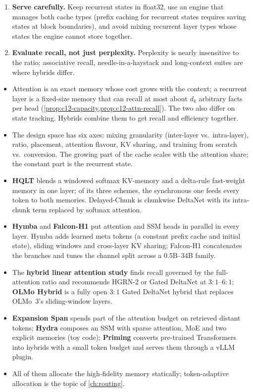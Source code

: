 \begin{enumerate}
  Otherwise prime a pre-trained Transformer: seed the recurrent layers from the attention weights,
  distill on final hidden states, then post-train with long-context data.
  \item \textbf{Serve carefully.} Keep recurrent states in float32, use an engine that manages
  both cache types (prefix caching for recurrent states requires saving states at block
  boundaries), and avoid mixing recurrent layer types whose states the engine cannot store together.
  \item \textbf{Evaluate recall, not just perplexity.} Perplexity is nearly insensitive to the
  ratio; associative recall, needle-in-a-haystack and long-context suites are where hybrids differ.
\end{enumerate}

\begin{summarybox}
\begin{itemize}
  \item Attention is an exact memory whose cost grows with the context; a recurrent layer is a
  fixed-size memory that can recall at most about $d_k$ arbitrary facts per head
  (\cref{prop:c12-capacity,prop:c12-attn-recall}). The two also differ on state tracking. Hybrids
  combine them to get recall and efficiency together.
  \item The design space has six axes: mixing granularity (inter-layer vs.\ intra-layer), ratio,
  placement, attention flavour, KV sharing, and training from scratch vs.\ conversion. The growing
  part of the cache scales with the attention share; the constant part is the recurrent state.
  \item \textbf{HQLT} blends a windowed softmax KV-memory and a delta-rule fast-weight memory in one
  layer; of its three schemes, the synchronous one feeds every token to both memories.
  Delayed-Chunk is chunkwise DeltaNet with its intra-chunk term replaced by softmax attention.
  \item \textbf{Hymba} and \textbf{Falcon-H1} put attention and SSM heads in parallel in every layer.
  Hymba adds learned meta tokens (a constant prefix cache and initial state), sliding windows and
  cross-layer KV sharing; Falcon-H1 concatenates the branches and tunes the channel split across a
  0.5B--34B family.
  \item The \textbf{hybrid linear attention study} finds recall governed by the full-attention ratio
  and recommends HGRN-2 or Gated DeltaNet at $3{:}1$--$6{:}1$; \textbf{OLMo Hybrid} is a fully open
  $3{:}1$ Gated DeltaNet hybrid that replaces OLMo~3's sliding-window layers.
  \item \textbf{Expansion Span} spends part of the attention budget on retrieved distant tokens;
  \textbf{Hydra} composes an SSM with sparse attention, MoE and two explicit memories (toy code);
  \textbf{Priming} converts pre-trained Transformers into hybrids with a small token budget and
  serves them through a vLLM plugin.
  \item All of them allocate the high-fidelity memory statically; token-adaptive allocation is the
  topic of \cref{ch:routing}.
\end{itemize}
\end{summarybox}

